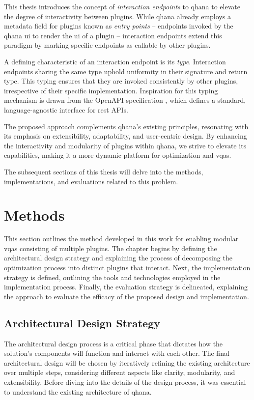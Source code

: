 \documentclass[
  a4paper,  %
  twoside,  %
  bibliography=totoc,
  headsepline,
  cleardoublepage=empty,
  parskip=half,
  draft=false
]{scrbook}
\begin{document}
This thesis introduces the concept of \emph{interaction endpoints} to \gls{qhana} to elevate the degree of interactivity between plugins.
While \gls{qhana} already employs a metadata field for plugins known as \emph{entry points} -- endpoints invoked by the \gls{qhana} \gls{ui} to render the \gls{ui} of a plugin -- interaction endpoints extend this paradigm by marking specific endpoints as callable by other plugins.

A defining characteristic of an interaction endpoint is its \emph{type}.
Interaction endpoints sharing the same type uphold uniformity in their signature and return type.
This typing ensures that they are invoked consistently by other plugins, irrespective of their specific implementation.
Inspiration for this typing mechanism is drawn from the OpenAPI specification \cite{Miller}, which defines a standard, language-agnostic interface for \gls{rest} APIs.

The proposed approach complements \gls{qhana}'s existing principles, resonating with its emphasis on extensibility, adaptability, and user-centric design.
By enhancing the interactivity and modularity of plugins within \gls{qhana}, we strive to elevate its capabilities, making it a more dynamic platform for optimization and \glspl{vqa}.

The subsequent sections of this thesis will delve into the methods, implementations, and evaluations related to this problem.


\chapter{Methods}
\label{chap:methodology}
This section outlines the method developed in this work for enabling modular \glspl{vqa} consisting of multiple plugins.
The chapter begins by defining the architectural design strategy and explaining the process of decomposing the optimization process into distinct plugins that interact.
Next, the implementation strategy is defined, outlining the tools and technologies employed in the implementation process.
Finally, the evaluation strategy is delineated, explaining the approach to evaluate the efficacy of the proposed design and implementation.

\section{Architectural Design Strategy}
\label{sec:architecturalDesignStrategy}

The architectural design process is a critical phase that dictates how the solution's components will function and interact with each other.
The final architectural design will be chosen by iteratively refining the existing architecture over multiple steps, considering different aspects like clarity, modularity, and extensibility.
Before diving into the details of the design process, it was essential to understand the existing architecture of \gls{qhana}.
\end{document}
